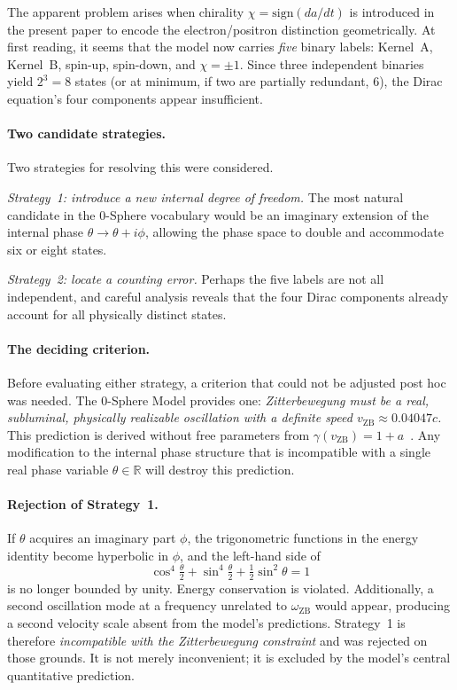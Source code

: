 \documentclass[%
 reprint, amsmath,amssymb, aps, prb, ]{revtex4-2}
\numberwithin{equation}{section}
\newcommand{\iphase}{\theta}
\begin{document}
The apparent problem arises when chirality $\chi = \mathrm{sign}(da/dt)$ is introduced in the present paper to encode the electron/positron distinction geometrically. At first reading, it seems that the model now carries \emph{five} binary labels: Kernel~A, Kernel~B, spin-up, spin-down, and $\chi = \pm1$. Since three independent binaries yield $2^3 = 8$ states (or at minimum, if two are partially redundant, 6), the Dirac equation's four components appear insufficient.

\paragraph{Two candidate strategies.}
Two strategies for resolving this were considered.

\textit{Strategy~1: introduce a new internal degree of freedom.} The most natural candidate in the 0-Sphere vocabulary would be an imaginary extension of the internal phase $\iphase \to \iphase + i\phi$, allowing the phase space to double and accommodate six or eight states.

\textit{Strategy~2: locate a counting error.} Perhaps the five labels are not all independent, and careful analysis reveals that the four Dirac components already account for all physically distinct states.

\paragraph{The deciding criterion.}
Before evaluating either strategy, a criterion that could not be adjusted post hoc was needed. The 0-Sphere Model provides one: \emph{Zitterbewegung must be a real, subluminal, physically realizable oscillation with a definite speed $v_\mathrm{ZB} \approx 0.04047c$.} This prediction is derived without free parameters from $\gamma(v_\mathrm{ZB}) = 1 + a$~\cite{hanamura33, hanamura10}. Any modification to the internal phase structure that is incompatible with a single real phase variable $\iphase \in \mathbb{R}$ will destroy this prediction.

\paragraph{Rejection of Strategy~1.}
If $\iphase$ acquires an imaginary part $\phi$, the trigonometric functions in the energy identity become hyperbolic in $\phi$, and the left-hand side of
\begin{equation*}
\cos^4\!\tfrac{\iphase}{2} + \sin^4\!\tfrac{\iphase}{2} + \tfrac{1}{2}\sin^2\iphase = 1
\end{equation*}
is no longer bounded by unity. Energy conservation is violated. Additionally, a second oscillation mode at a frequency unrelated to $\omega_\mathrm{ZB}$ would appear, producing a second velocity scale absent from the model's predictions. Strategy~1 is therefore \emph{incompatible with the Zitterbewegung constraint} and was rejected on those grounds. It is not merely inconvenient; it is excluded by the model's central quantitative prediction.
\end{document}
